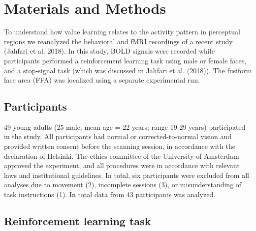 \documentclass[]{article}
\begin{document}
\hypertarget{materials-and-methods}{%
\section{Materials and Methods}\label{materials-and-methods}}

To understand how value learning relates to the activity pattern in
perceptual regions we reanalyzed the behavioral and fMRI recordings of a
recent study (Jahfari et al. 2018). In this study, BOLD signals were
recorded while participants performed a reinforcement learning task
using male or female faces, and a stop-signal task (which was discussed
in Jahfari et al. (2018)). The fusiform face area (FFA) was localized
using a separate experimental run.

\hypertarget{participants}{%
\subsection{Participants}\label{participants}}

49 young adults (25 male; mean age = 22 years; range 19-29 years)
participated in the study. All participants had normal or
corrected-to-normal vision and provided written consent before the
scanning session, in accordance with the declaration of Helsinki. The
ethics committee of the University of Amsterdam approved the experiment,
and all procedures were in accordance with relevant laws and
institutional guidelines. In total, six participants were excluded from
all analyses due to movement (2), incomplete sessions (3), or
misunderstanding of task instructions (1). In total data from 43
participants was analyzed.

\hypertarget{reinforcement-learning-task}{%
\subsection{Reinforcement learning
task}\label{reinforcement-learning-task}}
\end{document}
